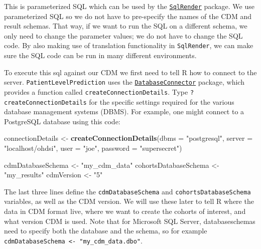 \documentclass[
]{article}
\newenvironment{Shaded}{\begin{snugshade}}{\end{snugshade}}
\newcommand{\DataTypeTok}[1]{\textcolor[rgb]{0.13,0.29,0.53}{#1}}
\newcommand{\KeywordTok}[1]{\textcolor[rgb]{0.13,0.29,0.53}{\textbf{#1}}}
\newcommand{\NormalTok}[1]{#1}
\newcommand{\StringTok}[1]{\textcolor[rgb]{0.31,0.60,0.02}{#1}}
\begin{document}
This is parameterized SQL which can be used by the
\href{http://github.com/OHDSI/SqlRender}{\texttt{SqlRender}} package. We
use parameterized SQL so we do not have to pre-specify the names of the
CDM and result schemas. That way, if we want to run the SQL on a
different schema, we only need to change the parameter values; we do not
have to change the SQL code. By also making use of translation
functionality in \texttt{SqlRender}, we can make sure the SQL code can
be run in many different environments.

To execute this sql against our CDM we first need to tell R how to
connect to the server. \texttt{PatientLevelPrediction} uses the
\href{http://github.com/ohdsi/DatabaseConnector}{\texttt{DatabaseConnector}}
package, which provides a function called
\texttt{createConnectionDetails}. Type \texttt{?createConnectionDetails}
for the specific settings required for the various database management
systems (DBMS). For example, one might connect to a PostgreSQL database
using this code:

\begin{Shaded}
\begin{Highlighting}[]
\NormalTok{  connectionDetails <-}\StringTok{ }\KeywordTok{createConnectionDetails}\NormalTok{(}\DataTypeTok{dbms =} \StringTok{"postgresql"}\NormalTok{, }
  \DataTypeTok{server =} \StringTok{"localhost/ohdsi"}\NormalTok{, }
  \DataTypeTok{user =} \StringTok{"joe"}\NormalTok{, }
  \DataTypeTok{password =} \StringTok{"supersecret"}\NormalTok{)}
  
\NormalTok{  cdmDatabaseSchema <-}\StringTok{ "my_cdm_data"}
\NormalTok{  cohortsDatabaseSchema <-}\StringTok{ "my_results"}
\NormalTok{  cdmVersion <-}\StringTok{ "5"}
\end{Highlighting}
\end{Shaded}

The last three lines define the \texttt{cdmDatabaseSchema} and
\texttt{cohortsDatabaseSchema} variables, as well as the CDM version. We
will use these later to tell R where the data in CDM format live, where
we want to create the cohorts of interest, and what version CDM is used.
Note that for Microsoft SQL Server, databaseschemas need to specify both
the database and the schema, so for example
\texttt{cdmDatabaseSchema\ \textless{}-\ "my\_cdm\_data.dbo"}.
\end{document}
